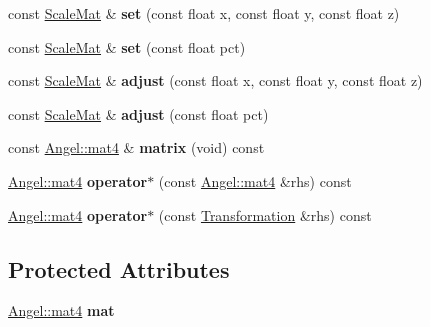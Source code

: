 \begin{DoxyCompactItemize}
\item 
\hypertarget{class_scale_mat_ae8b855d2dc58511ab404d5c275936e7d}{const \hyperlink{class_scale_mat}{Scale\-Mat} \& {\bfseries set} (const float x, const float y, const float z)}\label{class_scale_mat_ae8b855d2dc58511ab404d5c275936e7d}

\item 
\hypertarget{class_scale_mat_a2c543c3aa6c795de16fba8cb40434a4f}{const \hyperlink{class_scale_mat}{Scale\-Mat} \& {\bfseries set} (const float pct)}\label{class_scale_mat_a2c543c3aa6c795de16fba8cb40434a4f}

\item 
\hypertarget{class_scale_mat_a6d6d05f3af9012223bb0b61530f18688}{const \hyperlink{class_scale_mat}{Scale\-Mat} \& {\bfseries adjust} (const float x, const float y, const float z)}\label{class_scale_mat_a6d6d05f3af9012223bb0b61530f18688}

\item 
\hypertarget{class_scale_mat_a5cb132a1dec58200eceaa33c4c619580}{const \hyperlink{class_scale_mat}{Scale\-Mat} \& {\bfseries adjust} (const float pct)}\label{class_scale_mat_a5cb132a1dec58200eceaa33c4c619580}

\item 
\hypertarget{class_transformation_afcec300424207fc1d20864b73136937e}{const \hyperlink{class_angel_1_1mat4}{Angel\-::mat4} \& {\bfseries matrix} (void) const }\label{class_transformation_afcec300424207fc1d20864b73136937e}

\item 
\hypertarget{class_transformation_afdfbf48815a5b0d885f3b93f04cd2c66}{\hyperlink{class_angel_1_1mat4}{Angel\-::mat4} {\bfseries operator$\ast$} (const \hyperlink{class_angel_1_1mat4}{Angel\-::mat4} \&rhs) const }\label{class_transformation_afdfbf48815a5b0d885f3b93f04cd2c66}

\item 
\hypertarget{class_transformation_a85b923e0066365ef2e4aec3671396410}{\hyperlink{class_angel_1_1mat4}{Angel\-::mat4} {\bfseries operator$\ast$} (const \hyperlink{class_transformation}{Transformation} \&rhs) const }\label{class_transformation_a85b923e0066365ef2e4aec3671396410}

\end{DoxyCompactItemize}
\subsection*{Protected Attributes}
\begin{DoxyCompactItemize}
\item 
\hypertarget{class_transformation_a5f39fb578a1cdf78ca85efbd932d3834}{\hyperlink{class_angel_1_1mat4}{Angel\-::mat4} {\bfseries mat}}\label{class_transformation_a5f39fb578a1cdf78ca85efbd932d3834}

\end{DoxyCompactItemize}


